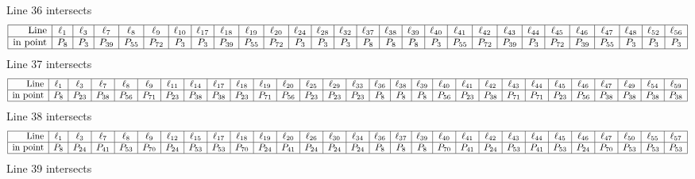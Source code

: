 \documentclass{article}
\begin{document}
{$$$$
Line 36 intersects 
$$
\begin{array}{|r*{27}{|c}|}
\hline
\mbox{Line}  & \ell_{1} & \ell_{3} & \ell_{7} & \ell_{8} & \ell_{9} & \ell_{10} & \ell_{17} & \ell_{18} & \ell_{19} & \ell_{20} & \ell_{24} & \ell_{28} & \ell_{32} & \ell_{37} & \ell_{38} & \ell_{39} & \ell_{40} & \ell_{41} & \ell_{42} & \ell_{43} & \ell_{44} & \ell_{45} & \ell_{46} & \ell_{47} & \ell_{48} & \ell_{52} & \ell_{56}\\
\hline
\mbox{in point}  & P_{8} & P_{3} & P_{39} & P_{55} & P_{72} & P_{3} & P_{3} & P_{39} & P_{55} & P_{72} & P_{3} & P_{3} & P_{3} & P_{8} & P_{8} & P_{8} & P_{3} & P_{55} & P_{72} & P_{39} & P_{3} & P_{72} & P_{39} & P_{55} & P_{3} & P_{3} & P_{3}\\
\hline
\end{array}
$$
Line 37 intersects 
$$
\begin{array}{|r*{28}{|c}|}
\hline
\mbox{Line}  & \ell_{1} & \ell_{3} & \ell_{7} & \ell_{8} & \ell_{9} & \ell_{11} & \ell_{14} & \ell_{17} & \ell_{18} & \ell_{19} & \ell_{20} & \ell_{25} & \ell_{29} & \ell_{33} & \ell_{36} & \ell_{38} & \ell_{39} & \ell_{40} & \ell_{41} & \ell_{42} & \ell_{43} & \ell_{44} & \ell_{45} & \ell_{46} & \ell_{47} & \ell_{49} & \ell_{54} & \ell_{59}\\
\hline
\mbox{in point}  & P_{8} & P_{23} & P_{38} & P_{56} & P_{71} & P_{23} & P_{38} & P_{38} & P_{23} & P_{71} & P_{56} & P_{23} & P_{23} & P_{23} & P_{8} & P_{8} & P_{8} & P_{56} & P_{23} & P_{38} & P_{71} & P_{71} & P_{23} & P_{56} & P_{38} & P_{38} & P_{38} & P_{38}\\
\hline
\end{array}
$$
Line 38 intersects 
$$
\begin{array}{|r*{28}{|c}|}
\hline
\mbox{Line}  & \ell_{1} & \ell_{3} & \ell_{7} & \ell_{8} & \ell_{9} & \ell_{12} & \ell_{15} & \ell_{17} & \ell_{18} & \ell_{19} & \ell_{20} & \ell_{26} & \ell_{30} & \ell_{34} & \ell_{36} & \ell_{37} & \ell_{39} & \ell_{40} & \ell_{41} & \ell_{42} & \ell_{43} & \ell_{44} & \ell_{45} & \ell_{46} & \ell_{47} & \ell_{50} & \ell_{55} & \ell_{57}\\
\hline
\mbox{in point}  & P_{8} & P_{24} & P_{41} & P_{53} & P_{70} & P_{24} & P_{53} & P_{53} & P_{70} & P_{24} & P_{41} & P_{24} & P_{24} & P_{24} & P_{8} & P_{8} & P_{8} & P_{70} & P_{41} & P_{24} & P_{53} & P_{41} & P_{53} & P_{24} & P_{70} & P_{53} & P_{53} & P_{53}\\
\hline
\end{array}
$$
Line 39 intersects 
$$
\begin{array}{|r*{28}{|c}|}

\end{array}$$}
\end{document}
